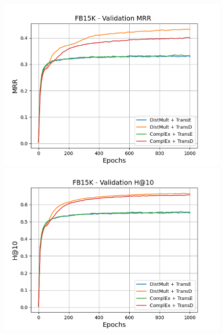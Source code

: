 \begin{figure}[H]
    \centering
    \begin{minipage}{.5\textwidth}
      \centering
      \includegraphics[width=\linewidth]{figures/results/gan_train/not_pretrained/uncertainty/max_distribution/entropy/fb15k/1k_epochs/uncertainty_fb15k_mrrs.png}
    \end{minipage}%
    \begin{minipage}{.5\textwidth}
      \centering
      \includegraphics[width=\linewidth]{figures/results/gan_train/not_pretrained/uncertainty/max_distribution/entropy/fb15k/1k_epochs/uncertainty_fb15k_hit10.png}
    \end{minipage}
    

\end{figure}
